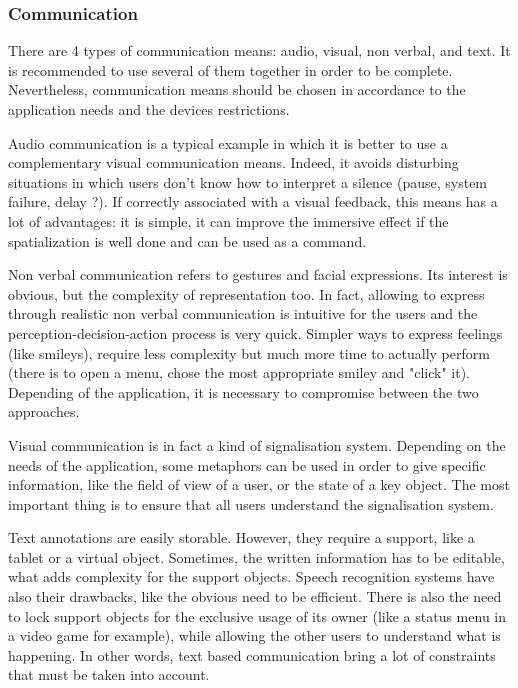 \documentclass[a4paper]{article}
\begin{document}
\subsubsection{Communication}

There are 4 types of communication means: audio, visual, non verbal, and text. It is recommended to use several of them together in order to be complete. Nevertheless, communication means should be chosen in accordance to the application needs and the devices restrictions.

Audio communication is a typical example in which it is better to use a complementary visual communication means. Indeed, it avoids disturbing situations in which users don't know how to interpret a silence (pause, system failure, delay ?). If correctly associated with a visual feedback, this means has a lot of advantages: it is simple, it can improve the immersive effect if the spatialization is well done and can be used as a command.

Non verbal communication refers to gestures and facial expressions. Its interest is obvious, but the complexity of representation too. In fact, allowing to express through realistic non verbal communication is intuitive for the users and the perception-decision-action process is very quick. Simpler ways to express feelings (like smileys), require less complexity but much more time to actually perform (there is to open a menu, chose the most appropriate smiley and "click" it). Depending of the application, it is necessary to compromise between the two approaches.

Visual communication is in fact a kind of signalisation system. Depending on the needs of the application, some metaphors can be used in order to give specific information, like the field of view of a user, or the state of a key object. The most important thing is to ensure that all users understand the signalisation system.

Text annotations are easily storable. However, they require a support, like a tablet or a virtual object. Sometimes, the written information has to be editable, what adds complexity for the support objects. Speech recognition systems have also their drawbacks, like the obvious need to be efficient. There is also the need to lock support objects for the exclusive usage of its owner (like a status menu in a video game for example), while allowing the other users to understand what is happening. In other words, text based communication bring a lot of constraints that must be taken into account.
\end{document}
